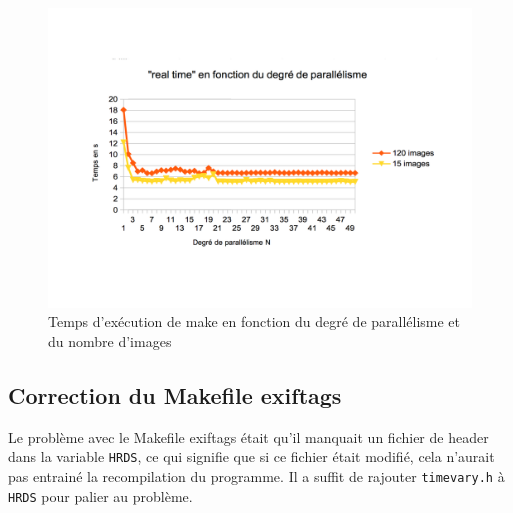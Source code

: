 \documentclass[10.9pt]{article}
\begin{document}
\begin{figure}[!h]
\begin{center}
  \includegraphics[width=12 cm]{time120-15chart_enhanced.pdf}
  \caption{Temps d'exécution de make en fonction du degré de
    parallélisme et du nombre d'images}
\end{center}
\label{fig:time_graph}
\end{figure}

\subsection{Correction du Makefile exiftags}Le problème avec le Makefile
exiftags était qu'il manquait un fichier de header dans la variable
\lstinline!HRDS!, ce qui signifie que si ce fichier était modifié, cela
n'aurait pas entrainé la recompilation du programme. Il a suffit de rajouter
\lstinline!timevary.h! à \lstinline!HRDS! pour palier au problème.
\end{document}

